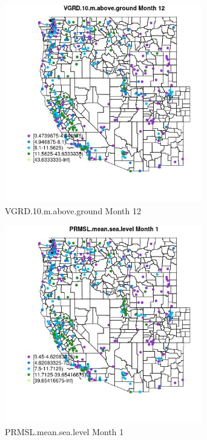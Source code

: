 \begin{figure} 
\centering  
\includegraphics[width=0.77\textwidth]{Code_Outputs/ML_input_report_ML_input_PM25_Step5_part_d_de_duplicated_aves_ML_input_MapObsMo12VGRD10maboveground.jpg} 
\caption{\label{fig:ML_input_report_ML_input_PM25_Step5_part_d_de_duplicated_aves_ML_inputMapObsMo12VGRD10maboveground}VGRD.10.m.above.ground Month 12} 
\end{figure} 
 

\begin{figure} 
\centering  
\includegraphics[width=0.77\textwidth]{Code_Outputs/ML_input_report_ML_input_PM25_Step5_part_d_de_duplicated_aves_ML_input_MapObsMo1PRMSLmeansealevel.jpg} 
\caption{\label{fig:ML_input_report_ML_input_PM25_Step5_part_d_de_duplicated_aves_ML_inputMapObsMo1PRMSLmeansealevel}PRMSL.mean.sea.level Month 1} 
\end{figure} 
 

